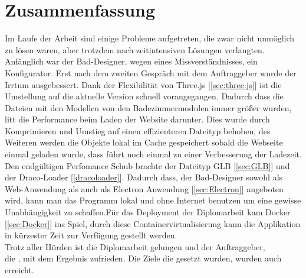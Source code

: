 \chapter{Zusammenfassung}
Im Laufe der Arbeit sind einige Probleme aufgetreten, die zwar nicht unmöglich zu lösen waren, aber trotzdem nach zeitintensiven Lösungen verlangten. Anfänglich war der Bad-Designer, wegen eines Missverständnisses, ein Konfigurator. Erst nach dem zweiten Gespräch mit dem Auftraggeber wurde der Irrtum ausgebessert. Dank der Flexibilität von Three.js [\ref{sec:three.js}] ist die Umstellung auf die aktuelle Version schnell vorangegangen. Dadurch dass die Dateien mit den Modellen von den Badezimmermodulen immer größer wurden, litt die Performance beim Laden der Website darunter. Dies wurde durch Komprimieren und Umstieg auf einen effizienteren Dateityp behoben, des Weiteren werden die Objekte lokal im Cache gespeichert sobald die Webseite einmal geladen wurde, dass führt noch einmal zu einer Verbesserung der Ladezeit. Den endgültigen Perfomance Schub brachte der Dateityp GLB [\ref{sec:GLB}] und der Draco-Loader [\ref{dracoloader}]. Dadurch dass, der Bad-Designer sowohl als Web-Anwendung als auch als Electron Anwendung [\ref{sec:Electron}] angeboten wird, kann man das Programm lokal und ohne Internet benutzen um eine gewisse Unabhängigkeit zu schaffen.Für das Deployment der Diplomarbeit kam Docker [\ref{sec:Docker}] ins Spiel, durch diese Containervirtualisierung kann die Applikation in kürzester Zeit zur Verfügung gestellt werden. \\
Trotz aller Hürden ist die Diplomarbeit gelungen und der Auftraggeber, \\die {\projectpartner}, mit dem Ergebnis zufrieden. Die Ziele die gesetzt wurden, wurden auch erreicht.

